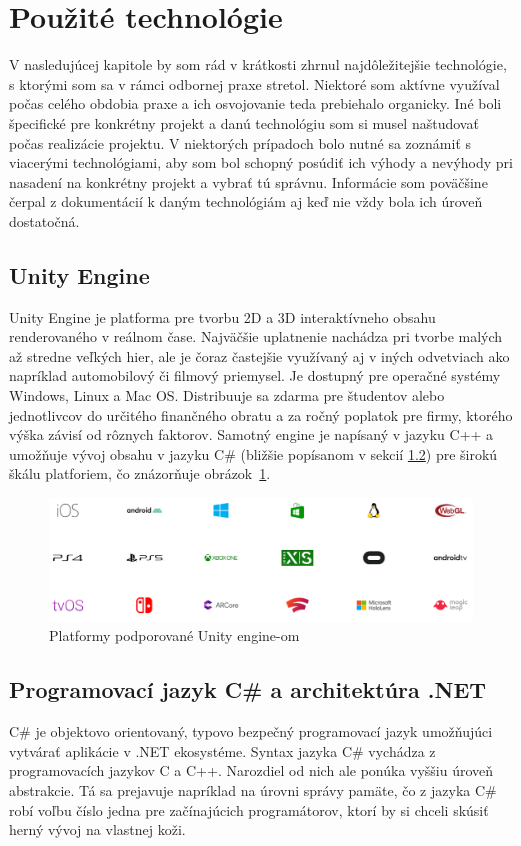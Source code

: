 \documentclass[slovak,bachelorpractice,dept460,male,csharp,cpdeclaration]{diploma}
\begin{document}
\section{Použité technológie}
\label{sec:Tech}
V nasledujúcej kapitole by som rád v krátkosti zhrnul najdôležitejšie technológie, s ktorými som sa v rámci odbornej praxe stretol. Niektoré som aktívne využíval počas celého obdobia praxe a ich osvojovanie teda prebiehalo organicky. Iné boli špecifické pre konkrétny projekt a danú technológiu som si musel naštudovať počas realizácie projektu. V niektorých prípadoch bolo nutné sa zoznámiť s viacerými technológiami, aby som bol schopný posúdiť ich výhody a nevýhody pri nasadení na konkrétny projekt a vybrať tú správnu. Informácie som poväčšine čerpal z dokumentácií k daným technológiám aj keď nie vždy bola ich úroveň dostatočná.
\subsection{Unity Engine}
\label{sec:Unity}
Unity Engine \cite{Unity} je platforma pre tvorbu 2D a 3D interaktívneho obsahu renderovaného v reálnom čase. Najväčšie uplatnenie nachádza pri tvorbe malých až stredne veľkých hier, ale je čoraz častejšie využívaný aj v iných odvetviach ako napríklad automobilový či filmový priemysel. Je dostupný pre operačné systémy Windows, Linux a Mac OS. Distribuuje sa zdarma pre študentov alebo jednotlivcov do určitého finančného obratu a za ročný poplatok pre firmy, ktorého výška závisí od rôznych faktorov. Samotný engine je napísaný v jazyku C++ a umožňuje vývoj obsahu v jazyku C\# (bližšie popísanom v sekcií \ref{sec:CsharpDotNet}) pre širokú škálu platforiem, čo znázorňuje \mbox{obrázok \ref{pic:UnityPlatforms}}.

\begin{figure}[!htbp]
	\centering
	\includegraphics[width=1\textwidth]{Pictures/platforms.png}
	\caption{Platformy podporované Unity engine-om \cite{UnityMultiplatform}}
	\label{pic:UnityPlatforms}
\end{figure}

\subsection{Programovací jazyk C\# a architektúra .NET}
\label{sec:CsharpDotNet}
C\# \cite{CSharpLang} je objektovo orientovaný, typovo bezpečný programovací jazyk umožňujúci vytvárať aplikácie v .NET ekosystéme. Syntax jazyka C\# vychádza z programovacích jazykov C a C++. Narozdiel od nich ale ponúka vyššiu úroveň abstrakcie. Tá sa prejavuje napríklad na úrovni správy pamäte, čo z jazyka C\# robí voľbu číslo jedna pre začínajúcich programátorov, ktorí by si chceli skúsiť herný vývoj na vlastnej koži.
\end{document}
